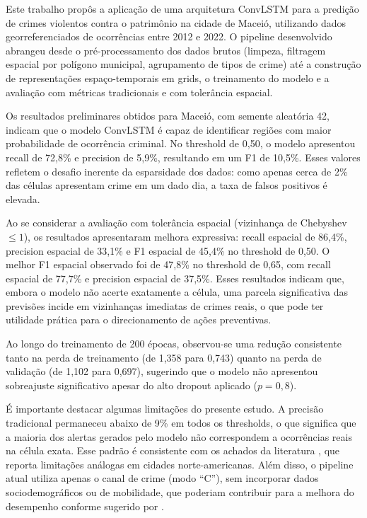 
\label{Cap:conclusao}

Este trabalho propôs a aplicação de uma arquitetura ConvLSTM para a predição de crimes violentos contra o patrimônio na cidade de Maceió, utilizando dados georreferenciados de ocorrências entre 2012 e 2022. O pipeline desenvolvido abrangeu desde o pré-processamento dos dados brutos (limpeza, filtragem espacial por polígono municipal, agrupamento de tipos de crime) até a construção de representações espaço-temporais em grids, o treinamento do modelo e a avaliação com métricas tradicionais e com tolerância espacial.

Os resultados preliminares obtidos para Maceió, com semente aleatória 42, indicam que o modelo ConvLSTM é capaz de identificar regiões com maior probabilidade de ocorrência criminal. No threshold de 0,50, o modelo apresentou recall de 72,8\% e precision de 5,9\%, resultando em um F1 de 10,5\%. Esses valores refletem o desafio inerente da esparsidade dos dados: como apenas cerca de 2\% das células apresentam crime em um dado dia, a taxa de falsos positivos é elevada. 

Ao se considerar a avaliação com tolerância espacial (vizinhança de Chebyshev $\leq 1$), os resultados apresentaram melhora expressiva: recall espacial de 86,4\%, precision espacial de 33,1\% e F1 espacial de 45,4\% no threshold de 0,50. O melhor F1 espacial observado foi de 47,8\% no threshold de 0,65, com recall espacial de 77,7\% e precision espacial de 37,5\%. Esses resultados indicam que, embora o modelo não acerte exatamente a célula, uma parcela significativa das previsões incide em vizinhanças imediatas de crimes reais, o que pode ter utilidade prática para o direcionamento de ações preventivas.

Ao longo do treinamento de 200 épocas, observou-se uma redução consistente tanto na perda de treinamento (de 1,358 para 0,743) quanto na perda de validação (de 1,102 para 0,697), sugerindo que o modelo não apresentou sobreajuste significativo apesar do alto dropout aplicado ($p = 0{,}8$).

É importante destacar algumas limitações do presente estudo. A precisão tradicional permaneceu abaixo de 9\% em todos os thresholds, o que significa que a maioria dos alertas gerados pelo modelo não correspondem a ocorrências reais na célula exata. Esse padrão é consistente com os achados da literatura \cite{albors_zumel_deep_2025}, que reporta limitações análogas em cidades norte-americanas. Além disso, o pipeline atual utiliza apenas o canal de crime (modo ``C''), sem incorporar dados sociodemográficos ou de mobilidade, que poderiam contribuir para a melhora do desempenho conforme sugerido por .

